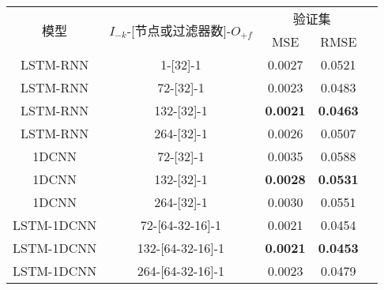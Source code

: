 \begin{table}[!htbp]
  \centering
  \label{tab:ss_area_out_1}
  \footnotesize
  \renewcommand{\arraystretch}{1}
  \begin{tabular}{ccccc}
    \toprule
    \multirow{2}{*}{模型} & \multirow{2}{*}{$I_{-k}$-[节点或过滤器数]-$O_{+f}$} & \multicolumn{2}{c}{验证集}\\
    \cmidrule(lr){3-4}
    \noalign{\smallskip}
    & & MSE & RMSE\\
    \midrule 
    LSTM-RNN & 1-[32]-1 & 0.0027 & 0.0521 \\
    LSTM-RNN & 72-[32]-1 & 0.0023 & 0.0483 \\
    LSTM-RNN & 132-[32]-1 & \textbf{0.0021} & \textbf{0.0463} \\
    LSTM-RNN & 264-[32]-1 & 0.0026 & 0.0507 \\
    \hline
    1DCNN & 72-[32]-1 & 0.0035 & 0.0588 \\
    1DCNN & 132-[32]-1 & \textbf{0.0028} & \textbf{0.0531} \\
    1DCNN & 264-[32]-1 & 0.0030 & 0.0551 \\
    \hline
    LSTM-1DCNN & 72-[64-32-16]-1 & 0.0021 & 0.0454 \\
    LSTM-1DCNN & 132-[64-32-16]-1 & \textbf{0.0021} & \textbf{0.0453} \\
    LSTM-1DCNN & 264-[64-32-16]-1 & 0.0023 & 0.0479 \\
    \bottomrule
\end{tabular}
\end{table}

